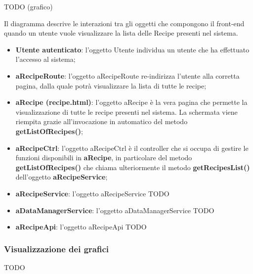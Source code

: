	TODO (grafico) \newline
	\noindent

	Il diagramma descrive le interazioni tra gli oggetti che compongono il front-end quando un utente vuole visualizzare la lista delle Recipe presenti nel sistema.
	\begin{itemize}
		\item \textbf{Utente autenticato}: l'oggetto Utente individua un utente che ha effettuato l'accesso al sistema;
		\item \textbf{aRecipeRoute}: l'oggetto aRecipeRoute re-indirizza l'utente alla corretta pagina, dalla quale potrà visualizzare la lista di tutte le recipe;
		\item \textbf{aRecipe (recipe.html)}: l'oggetto aRecipe è la vera pagina che permette la visualizzazione di tutte le recipe presenti nel sistema. La schermata viene riempita grazie all'invocazione in automatico del metodo \textbf{getListOfRecipes()};
		\item \textbf{aRecipeCtrl}: l'oggetto aRecipeCtrl è il controller che si occupa di gestire le funzioni disponibili in \textbf{aRecipe}, in particolare del metodo \textbf{getListOfRecipes()} che chiama ulteriormente il metodo \textbf{getRecipesList()} dell'oggetto \textbf{aRecipeService};
		\item \textbf{aRecipeService}: l'oggetto aRecipeService TODO
		\item \textbf{aDataManagerService}: l'oggetto aDataManagerService TODO
		\item \textbf{aRecipeApi}: l'oggetto aRecipeApi TODO
	\end{itemize}

	\subsubsection{Visualizzazione dei grafici} %
	\label{sub:visualizzazione_dei_grafici}
	TODO

